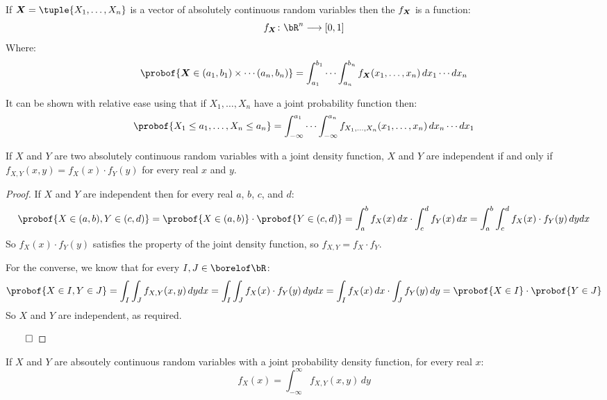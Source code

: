 \begin{defn*}

	If $\jpv=\tuple{X_1,\dots,X_n}$ is a vector of absolutely continuous random variables then the  $f_{\boldsymbol{X}}$
	is a function:
	\[ f_{\jpv}\colon\bR^n\longrightarrow[0,1] \]
	Where:
	\[ \probof{\jpv\in(a_1,b_1)\times\cdots(a_n,b_n)} = \int_{a_1}^{b_1}\cdots\int_{a_n}^{b_n} f_{\jpv}(x_1,\dots,x_n)\,dx_1\cdots dx_n \]

\end{defn*}

It can be shown with relative ease using  that if $X_1,\dots,X_n$ have a joint probability function then:
\[ \probof{X_1\leq a_1,\dots,X_n\leq a_n} = \int_{-\infty}^{a_1}\cdots\int_{-\infty}^{a_n} f_{X_1,\dots,X_n}(x_1,\dots,x_n)\,dx_n\cdots dx_1 \]

\begin{prop*}

	If $X$ and $Y$ are two absolutely continuous random variables with a joint density function, $X$ and $Y$ are independent if and only if
	$f_{X,Y}(x,y)=f_X(x)\cdot f_Y(y)$ for every real $x$ and $y$.

\end{prop*}

\begin{proof}

	If $X$ and $Y$ are independent then for every real $a$, $b$, $c$, and $d$:
	\[ \probof{X\in(a,b), Y\in(c,d)} = \probof{X\in(a,b)}\cdot\probof{Y\in(c,d)} = \int_a^b f_X(x)\,dx \cdot \int_c^d f_Y(x)\,dx = 
	\int_a^b\int_c^d f_X(x)\cdot f_Y(y)\,dy dx \]
	So $f_X(x)\cdot f_Y(y)$ satisfies the property of the joint density function, so $f_{X,Y}=f_X\cdot f_Y$.

	For the converse, we know that for every $I,J\in\borelof\bR$:
	\[ \probof{X\in I, Y\in J} = \int_I\int_J f_{X,Y}(x,y)\,dy dx = \int_I\int_J f_X(x)\cdot f_Y(y)\,dy dx =
	\int_I f_X(x)\,dx \cdot \int_J f_Y(y)\,dy = \probof{X\in I}\cdot\probof{Y\in J} \]
	So $X$ and $Y$ are independent, as required.

	\hfill$\qed$

\end{proof}

\begin{prop*}

	If $X$ and $Y$ are absoutely continuous random variables with a joint probability density function, for every real $x$:
	\[ f_X(x) = \int_{-\infty}^\infty f_{X,Y}(x,y)\,dy \]

\end{prop*}

